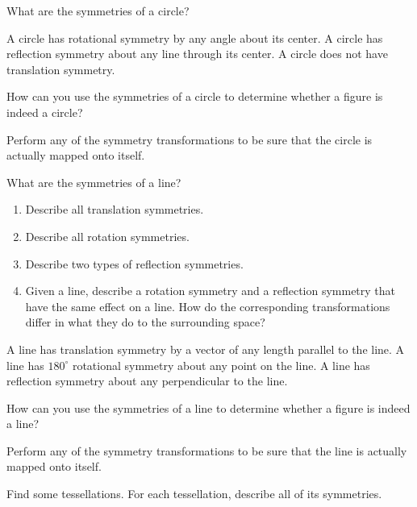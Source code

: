 \documentclass[nooutcomes]{ximera}
\begin{document}
\begin{question}
What are the symmetries of a circle? 
\begin{freeResponse}
\begin{hint}
A circle has rotational symmetry by any angle about its center.  A circle has reflection symmetry about any line through its center.  A circle does not have translation symmetry.  
\end{hint}
\end{freeResponse}
\end{question}

\begin{question}
How can you use the symmetries of a circle to determine whether a figure is indeed a circle?  
\begin{freeResponse}
\begin{hint}
Perform any of the symmetry transformations to be sure that the circle is actually mapped onto itself.  
\end{hint}
\end{freeResponse}
\end{question}

\begin{question}
What are the symmetries of a line?  
\begin{enumerate}
\item Describe all translation symmetries.  
\item Describe all rotation symmetries.
\item Describe two types of reflection symmetries.
\item Given a line, describe a rotation symmetry and a reflection symmetry that have the same effect on a line.  How do the corresponding transformations differ in what they do to the surrounding space?  
\end{enumerate}
\begin{freeResponse}
\begin{hint}
A line has translation symmetry by a vector of any length parallel to the line.  A line has $180^\circ$ rotational symmetry about any point on the line.  A line has reflection symmetry about any perpendicular to the line.  
\end{hint}
\end{freeResponse}
\end{question}

\begin{question}
How can you use the symmetries of a line to determine whether a figure is indeed a line? 
\begin{freeResponse}
\begin{hint}
Perform any of the symmetry transformations to be sure that the line is actually mapped onto itself.  
\end{hint}
\end{freeResponse}
\end{question}

\begin{question}
Find some tessellations.  For each tessellation, describe all of its symmetries.  
\begin{freeResponse}
\begin{hint}
\end{hint}
\end{freeResponse}
\end{question}
\end{document}
